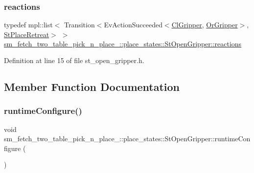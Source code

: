\subsubsection{\texorpdfstring{reactions}{reactions}}
{\footnotesize\ttfamily typedef mpl\+::list$<$ Transition$<$Ev\+Action\+Succeeded$<$\hyperlink{classsm__fetch__two__table__pick__n__place__1_1_1cl__gripper_1_1ClGripper}{Cl\+Gripper}, \hyperlink{classsm__fetch__two__table__pick__n__place__1_1_1OrGripper}{Or\+Gripper}$>$, \hyperlink{structsm__fetch__two__table__pick__n__place__1_1_1place__states_1_1StPlaceRetreat}{St\+Place\+Retreat}$>$ $>$ \hyperlink{structsm__fetch__two__table__pick__n__place__1_1_1place__states_1_1StOpenGripper_a9440af06479efb0aad6bce0d9469c8c9}{sm\+\_\+fetch\+\_\+two\+\_\+table\+\_\+pick\+\_\+n\+\_\+place\+\_\+::place\+\_\+states\+::\+St\+Open\+Gripper\+::reactions}}



Definition at line 15 of file st\+\_\+open\+\_\+gripper.\+h.



\subsection{Member Function Documentation}
\mbox{\label{structsm__fetch__two__table__pick__n__place__1_1_1place__states_1_1StOpenGripper_aee8c0464ce934e57ac581b8dbf384cd1}} 
\subsubsection{\texorpdfstring{runtime\+Configure()}{runtimeConfigure()}}
{\footnotesize\ttfamily void sm\+\_\+fetch\+\_\+two\+\_\+table\+\_\+pick\+\_\+n\+\_\+place\+\_\+::place\+\_\+states\+::\+St\+Open\+Gripper\+::runtime\+Configure (\begin{DoxyParamCaption}{ }\end{DoxyParamCaption})\hspace{0.3cm}{\ttfamily [inline]}}



